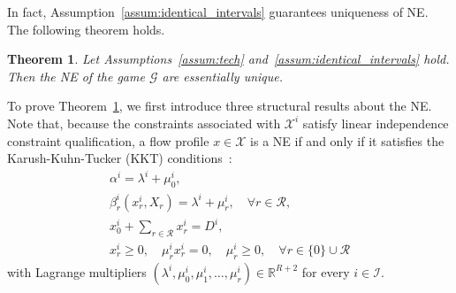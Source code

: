 \documentclass[letterpaper, 10 pt, conference]{ieeeconf}  %
\newcommand{\mc}[1]{\mathcal{#1}}
\newtheorem{theorem}{Theorem}
\begin{document}
In fact, Assumption~\ref{assum:identical_intervals} guarantees uniqueness of NE.
The following theorem holds.
\begin{theorem}\label{thm:uniqueness}
Let Assumptions~\ref{assum:tech} and~\ref{assum:identical_intervals} hold.
Then the NE of the game $\mc{G}$ are essentially unique.
\end{theorem}

To prove Theorem~\ref{thm:uniqueness}, we first introduce three structural results about the NE.
Note that, because the constraints associated with $\mc{X}^i$ satisfy linear independence constraint qualification, a flow profile $x\in\mc{X}$ is a NE if and only if it satisfies the Karush-Kuhn-Tucker (KKT) conditions~\cite[Chap.~5]{BoyVan}:
\begin{equation}\label{eq:KKT}
\begin{array}{l}
 \alpha^i=\lambda^i+\mu^i_0,\\
 \beta^i_r(x^i_r,X_r)=\lambda^i+\mu^i_r,\quad \forall r\in\mc{R},\\
 x^i_0+\sum_{r\in\mc{R}}x^i_r=D^i,\\
 x^i_r\geq 0,\quad \mu^i_rx^i_r=0,\quad \mu^i_r\geq 0, \quad \forall r\in \{0\}\cup \mc{R}
\end{array}
\end{equation}
with Lagrange multipliers $(\lambda^i,\mu^i_0,\mu^i_1,\ldots,\mu^i_r)\in\mathbb{R}^{R+2}$ for every $i \in \mc{I}$.
\end{document}
